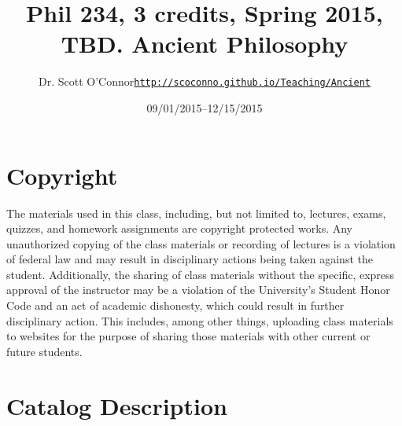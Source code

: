 \documentclass[article,oneside]{memoir}
\def\myauthor{Author}
\def\mytitle{Title}
\def\mycopyright{\myauthor}
\def\myweb{\href{http://scoconno.github.io/Teaching/Ancient}{http://scoconno.github.io/Teaching/Ancient}}
\def\myauthor{Dr. Scott O'Connor}
\def\mytitle{{\normalsize Phil 234, 3 credits, Spring 2015, TBD. \newline} \HUGE Ancient Philosophy}
\begin{document}
\setsansfont[Mapping=tex-text]{Myriad Pro} 
\setmonofont[Mapping=tex-text,Scale=0.8]{Georgia} 

\def\ind{\hangindent=1 true cm\hangafter=1 \noindent}
\def\labelitemi{$\cdot$}


\title{\LARGE \mytitle}     
\author{\Large\myauthor \newline \footnotesize\texttt{\noindent\myweb}}
\date{09/01/2015--12/15/2015}

\published{\today}

\maketitle




%
%

\section{Copyright}
The materials used in this class, including, but not limited to, lectures, exams, quizzes, and homework assignments are copyright protected works.  Any unauthorized copying of the class materials or recording of lectures is a violation of federal law and may result in disciplinary actions being taken against the student.  Additionally, the sharing of class materials without the specific, express approval of the instructor may be a violation of the University's Student Honor Code and an act of academic dishonesty, which could result in further disciplinary action.  This includes, among other things, uploading class materials to websites for the purpose of sharing those materials with other current or future students. 

\section{Catalog Description}
\end{document}
